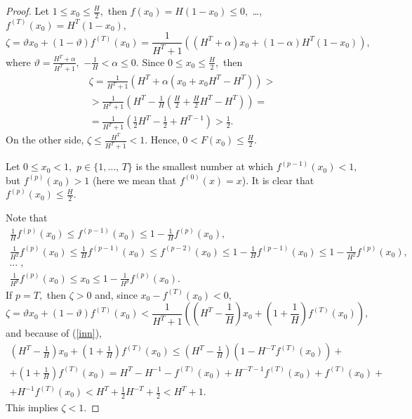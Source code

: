 \documentclass[12pt,a4paper]{amsart}
\begin{document}
\begin{proof}
Let $1\leq x_0 \leq \frac{H}{2},$ then $f(x_0)=H(1-x_0)\leq 0,$ \ldots, $f^{(T)}(x_0)=H^T (1-x_0),$
$$
\zeta=\vartheta x_0 + (1-\vartheta)f^{(T)}(x_0)=\frac{1}{H^T + 1} \left ( (H^T+\alpha)x_0 + (1-\alpha)H^T(1-x_0)\right),
$$
where $\vartheta=\frac{H^T+\alpha}{H^T+1},$ $-\frac{1}{H} < \alpha \leq 0.$ Since $0\leq x_0 \leq \frac{H}{2},$ then 
\begin{gather*}
\zeta = \frac{1}{H^T+1} \left( H^T + \alpha(x_0 + x_0 H^T - H^T)\right) > \\
> \frac{1}{H^T+1} \left( H^T - \frac{1}{H} \left(\frac{H}{2} + \frac{H}{2} H^T - H^T\right)\right) = \\
= \frac{1}{H^T+1} \left( \frac12 H^T - \frac12 + H^{T-1} \right) > \frac12.
\end{gather*}
On the other side, $\zeta \leq \frac{H^T}{H^T+1} < 1.$ Hence, $0 < F(x_0)\leq \frac{H}{2}.$

Let $0 \leq x_0 < 1,$ $p\in \{1,\ldots,\,T\}$ is the smallest number at which $f^{(p-1)}(x_0) < 1,$ but $f^{(p)}(x_0)>1$
(here we mean that $f^{(0)}(x)=x$). It is clear that $f^{(p)}(x_0) \leq \frac{H}{2}.$

Note that
\begin{gather*}
\frac{1}{H} f^{(p)}(x_0) \leq f^{(p-1)}(x_0) \leq 1 - \frac{1}{H} f^{(p)}(x_0), \\
\frac{1}{H^2} f^{(p)}(x_0) \leq \frac{1}{H} f^{(p-1)}(x_0) \leq f^{(p-2)}(x_0) \leq 1-\frac{1}{H} f^{(p-1)}(x_0) \leq 
1 - \frac{1}{H^2} f^{(p)}(x_0), \\
\ldots\;, \\
\frac{1}{H^p} f^{(p)}(x_0) \leq x_0 \leq 1 - \frac{1}{H^p} f^{(p)}(x_0).
\end{gather*}
If $p=T,$ then $\zeta  > 0$ and, since $x_0 - f^{(T)}(x_0) < 0,$ 
$$
\zeta=\vartheta x_0 + (1-\vartheta)f^{(T)}(x_0) < 
\frac{1}{H^T + 1} \left ( \left(H^T - \frac{1}{H}\right)x_0 + \left(1 + \frac{1}{H}\right) f^{(T)}(x_0) \right),
$$
and because of (\ref{inn}), 
\begin{gather*}
\left(H^T - \frac{1}{H}\right)x_0 + \left(1 + \frac{1}{H}\right) f^{(T)}(x_0) \leq \left(H^T - \frac{1}{H}\right)
\left(1 - H^{-T} f^{(T)}(x_0)\right) + \\
+ \left(1 + \frac{1}{H}\right) f^{(T)}(x_0) = H^T - H^{-1} -f^{(T)}(x_0) + H^{-T-1}f^{(T)}(x_0) + f^{(T)}(x_0) +\\
+ H^{-1}f^{(T)}(x_0) < H^T + \frac12 H^{-T} +\frac12 < H^T +1.
\end{gather*}
This implies $\zeta < 1.$


\end{proof}
\end{document}
